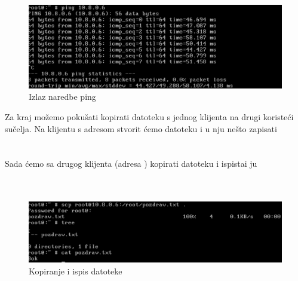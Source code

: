        \noindent
         \\
         \\
        \begin{figure}[H]
            \centering
            \includegraphics[scale=0.5]{slike/pingResult}
            \caption{Izlaz naredbe ping}
        \end{figure}

        Za kraj možemo pokušati kopirati datoteku s jednog klijenta na drugi
        koristeći  sučelja. Na klijentu s adresom 
        stvorit ćemo datoteku  i u nju nešto zapisati \\ 

        \noindent
         \\
         \\

        \noindent
        Sada ćemo sa drugog klijenta (adresa ) kopirati
         datoteku i ispistai ju \\
         \\
        \\

        \begin{figure}[H]
            \centering
            \includegraphics[scale=0.45]{slike/pozdrav}
            \caption{Kopiranje i ispis datoteke }
        \end{figure}
